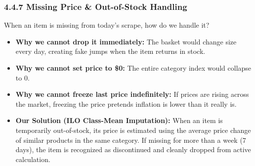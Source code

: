 \documentclass[10pt,a4paper]{article}
\begin{document}
\subsubsection*{4.4.7 Missing Price \& Out-of-Stock Handling}
\noindent
When an item is missing from today's scrape, how do we handle it?
\begin{itemize}[noitemsep,topsep=1pt,leftmargin=*]
    \item \textbf{Why we cannot drop it immediately:} The basket would change size every day, creating fake jumps when the item returns in stock.
    \item \textbf{Why we cannot set price to \$0:} The entire category index would collapse to 0.
    \item \textbf{Why we cannot freeze last price indefinitely:} If prices are rising across the market, freezing the price pretends inflation is lower than it really is.
    \item \textbf{Our Solution (ILO Class-Mean Imputation):} When an item is temporarily out-of-stock, its price is estimated using the average price change of similar products in the same category. If missing for more than a week (7 days), the item is recognized as discontinued and cleanly dropped from active calculation.
\end{itemize}
\end{document}
